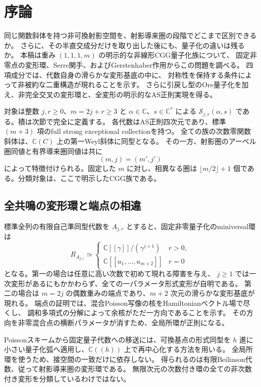 \section{序論}

同じ関数斜体を持つ非可換射影空間を、射影導来圏の段階でどこまで区別できるか。
さらに、その半直交成分だけを取り出した後にも、量子化の違いは残るか。
本稿は重み $(1,1,1,m)$ の明示的な非線形CGG量子化族について、
固定非零点の変形環、Serre関手、およびGerstenhaber作用からこの問題を調べる。
四項成分では、代数自身の滑らかな変形基底の中に、
対称性を保持する条件によって非被約な二重構造が現れることを示す。
さらに引戻し型のOre量子化を加え、非完全交叉の変形環と、全変形の明示的なAS正則実現を得る。

対象は整数 $j,r\ge0$、$m=2j+r\ge3$ と
$\alpha\in\mathbb C$、$s\in\mathbb C^*$ による
$\mathcal S_{j,r}(\alpha,s)$ である。積は次節で完全に定義する。
各代数はAS正則四次元であり、標準 $(m+3)$ 項のfull strong exceptional collectionを持つ。
全ての族の次数零関数斜体は、$\mathbb C(C)$ 上の第一Weyl斜体に同型となる。
その一方、射影圏のアーベル圏同値と有界導来圏同値は共に
\[
 \boxed{(m,j)=(m',j')}
\]
によって特徴付けられる。固定した $m$ に対し、相異なる圏は
$\lfloor m/2\rfloor+1$ 個である。分類対象は、ここで明示したCGG族である。

\subsection{全共鳴の変形環と端点の相違}

標準全列の有限自己準同型代数を $A_{j,r}$ とすると、固定非零量子化のminiversal環は
\[
 R_{A_{j,r}}\simeq
 \begin{cases}
 \mathbb C[[\gamma]]/(\gamma^{j+1})&r>0,\\
 \mathbb C[[u_1,\ldots,u_{m+2}]]&r=0
 \end{cases}
\]
となる。第一の場合は任意に高い次数で初めて現れる障害を与え、
$j\ge1$ では一次変形があるにもかかわらず、全ての一パラメータ形式変形が自明である。
第二の場合は $m=2j$ の偶数重みの端点であり、$m+2$ 次元の滑らかな変形基底が現れる。
端点の証明では、混合Poisson写像の核をHamiltonianベクトル場で尽くし、
調和多項式の分解によって余核がただ一方向であることを示す。
その方向を非零混合点の横断パラメータが消すため、全局所環が正則になる。

Poissonスキームから固定量子代数への移送には、可換基点の形式同型を
$h$ 進に小さい量子化弧へ適用し、$\mathbb C((h))$ 上で再中心化する方法を用いる。
全局所環を使うため、接空間の一致だけに依存しない。
得られるのは有限Beilinson代数、従って射影導来圏の変形環である。
無限次元の次数付き環の全ての非次数付き変形を分類しているわけではない。


